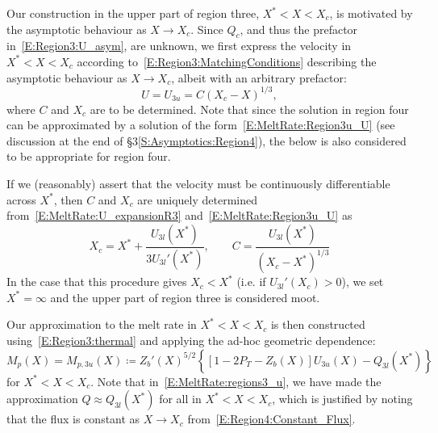 \documentclass[openacc]{rsproca_new}%
\newcommand{\Pt}{\textit{P}_T}
\begin{document}
Our construction in the upper part of region three, $X^* < X < X_c$, is motivated by the asymptotic behaviour as $X \to X_c$. Since $Q_c$, and thus the prefactor in~\eqref{E:Region3:U_asym}, are unknown, we first express the velocity in $X^* < X < X_c$ according to~\eqref{E:Region3:MatchingConditions} describing the asymptotic behaviour as $X\to X_c$, albeit with an arbitrary prefactor:
\begin{equation}\label{E:MeltRate:Region3u_U}
U =U_{3u} =  C (X_c - X)^{1/3},
\end{equation} 
where $C$ and $X_c$ are to be determined. Note that since the solution in region four can be approximated by a solution of the form~\eqref{E:MeltRate:Region3u_U} (see discussion at the end of \S3\ref{S:Asymptotics:Region4}), the below is also considered to be appropriate for region four.

If we (reasonably) assert that the velocity must be continuously differentiable across $X^*$, then $C$ and $X_c$ are uniquely determined from~\eqref{E:MeltRate:U_expansionR3} and~\eqref{E:MeltRate:Region3u_U} as
\begin{equation}\label{E:MeltRate:Xc_expression}
X_c = X^* + \frac{U_{3l}(X^*)}{3 U_{3l}'(X^*)}, \qquad C = \frac{U_{3l}(X^*)}{\left(X_c - X^*\right)^{1/3}}
\end{equation}
In the case that this procedure gives $X_c < X^*$ (i.e. if $U_{3l}'(X_c) > 0$), we set $X^* = \infty$ and the upper part of region three is considered moot.

Our approximation to the melt rate in $X^* < X <X_c$ is then constructed using~\eqref{E:Region3:thermal} and applying the ad-hoc geometric dependence:
\begin{equation}\label{E:MeltRate:regions3_u}
M_p(X) = M_{p,3u}(X) \coloneqq Z_b'(X)^{5/2}\left\{ \left[1  - 2\Pt -  Z_b(X)\right] U_{3u}(X) - Q_{3l}(X^*) \right\}
\end{equation}
for $X^* < X < X_c$. Note that in~\eqref{E:MeltRate:regions3_u}, we have made the approximation $Q \approx Q_{3l}(X^*)$ for all in $X^* < X < X_c$, which is justified by noting that the flux is constant as $X \to X_c$ from~\eqref{E:Region4:Constant_Flux}.
\end{document}
